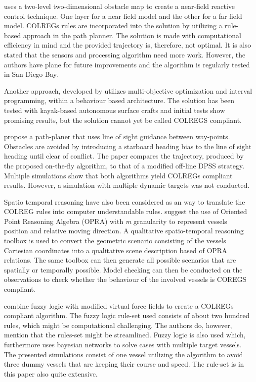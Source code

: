 \textcite{larson2007advances} uses a two-level two-dimensional obstacle map to create a near-field reactive control technique. One layer for a near field model and the other for a far field model. COLREGs rules are incorporated into the solution by utilizing a rule-based approach in the path planner. The solution is made with computational efficiency in mind and the provided trajectory is, therefore, not optimal. It is also stated that the sensors and processing algorithm need more work. However, the authors have plane for future improvements and the algorithm is regularly tested in San Diego Bay.


Another approach, developed by \textcite{benjamin2004colregs,benjamin2006method} utilizes multi-objective optimization and interval programming, within a behaviour based architecture. The solution has been tested with kayak-based autonomous surface crafts and initial tests show promising results, but the solution cannot yet be called COLREGS compliant.


\textcite{naeem2012colregs}
propose a path-planer that uses line of sight guidance between way-points. Obstacles are avoided by introducing a starboard heading bias to the line of sight heading until clear of conflict. The paper compares the trajectory, produced by the proposed on-the-fly algorithm, to that of a modified off-line DPSS strategy. Multiple simulations show that both algorithms yield COLREGs compliant results. However, a simulation with multiple dynamic targets was not conducted.

Spatio temporal reasoning have also been considered as an way to translate the COLREG rules into computer understandable rules. \textcite{spat_temp1,spat_temp2}
suggest the use of Oriented Point Reasoning Algebra (OPRA) with \textit{m}  granularity to represent vessels position and relative moving direction.
A qualitative spatio-temporal reasoning toolbox is used to convert the geometric scenario consisting of the vessels Cartesian coordinates into a qualitative scene description based of OPRA relations. The same toolbox can then generate all possible scenarios that are spatially or temporally possible. Model checking can then be conducted on the  observations to check whether the behaviour of the involved vessels is  COREGS compliant.


\textcite{lee2004fuzzy} combine fuzzy logic with modified virtual force fields to  create a COLREGs compliant algorithm. The fuzzy logic rule-set used consists of about two hundred rules, which might be computational challenging. The authors do, however, mention that the rules-set might be streamlined. Fuzzy logic is also used \textcite{perera2012intelligent} which, furthermore uses bayesian networks to solve cases with multiple target vessels. The presented simulations consist of one vessel utilizing the algorithm to avoid three dummy vessels that are keeping their course and speed. The rule-set is in this paper also quite extensive.



